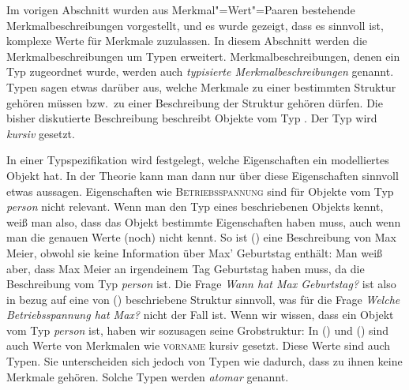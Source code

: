 Im vorigen Abschnitt wurden aus Merkmal"=Wert"=Paaren bestehende
Merkmalbeschreibungen vorgestellt, und es wurde gezeigt, dass es sinnvoll ist,
komplexe Werte für Merkmale zuzulassen.  In diesem Abschnitt werden die
Merkmalbeschreibungen um Typen erweitert. Merkmalbeschreibungen, denen ein Typ
zugeordnet wurde, werden auch \emph{typisierte Merkmalbeschreibungen} genannt.
Typen sagen etwas darüber aus, welche Merkmale zu einer
bestimmten Struktur gehören müssen bzw.\ zu einer Beschreibung der
Struktur gehören dürfen. Die bisher diskutierte Beschreibung beschreibt
Objekte vom Typ .
\ea
{}
\z
Der Typ wird \textit{kursiv} gesetzt. 

In einer Typspezifikation wird festgelegt, welche Eigenschaften ein modelliertes
Objekt hat. In der Theorie kann man dann nur über diese Eigenschaften sinnvoll etwas
aussagen. Eigenschaften wie \textsc{Betriebsspannung} sind für Objekte vom
Typ \textit{person} nicht relevant. Wenn man den Typ eines beschriebenen Objekts kennt,
weiß man also, dass das Objekt bestimmte Eigenschaften haben muss, auch wenn man
die genauen Werte (noch) nicht kennt. So ist () eine Beschreibung von
Max Meier, obwohl sie \zb keine Information über Max' Geburtstag enthält:
\ea
{}
\z
Man weiß aber, dass Max Meier an irgendeinem Tag Geburtstag haben muss, da die
Beschreibung vom Typ \textit{person} ist. Die Frage \emph{Wann hat Max Geburtstag?}
ist also in bezug auf eine von () beschriebene Struktur sinnvoll, was für die Frage
\emph{Welche Betriebsspannung hat Max?} nicht der Fall ist. Wenn wir wissen, dass ein Objekt vom Typ
\textit{person} ist, haben wir sozusagen seine Grobstruktur:
\ea
{}
\z
In () und () sind auch Werte von Merkmalen wie \textsc{vorname} kursiv gesetzt. Diese Werte sind auch
Typen. Sie unterscheiden sich jedoch von Typen wie  dadurch, dass zu ihnen keine
Merkmale gehören. Solche Typen werden \emph{atomar} genannt.

